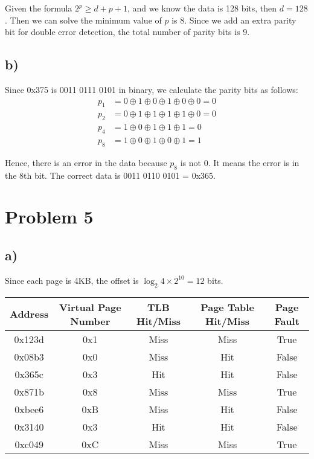 \documentclass[a4paper,12pt]{article}
\begin{document}
Given the formula $2^p \geq d + p + 1$, and we know the data is 128 bits, then $d = 128$.
Then we can solve the minimum value of $p$ is 8.
Since we add an extra parity bit for double error detection, the total number of parity bits is 9.

\subsection*{b)}

Since 0x375 is 0011 0111 0101 in binary, we calculate the parity bits as follows:
\begin{align*}
	p_1 &= 0 \oplus 1 \oplus 0 \oplus 1 \oplus 0 \oplus 0 = 0 \\
	p_2 &= 0 \oplus 1 \oplus 1 \oplus 1 \oplus 1 \oplus 0 = 0 \\
	p_4 &= 1 \oplus 0 \oplus 1 \oplus 1 \oplus 1 = 0 \\
	p_8 &= 1 \oplus 0 \oplus 1 \oplus 0 \oplus 1 = 1
\end{align*}

Hence, there is an error in the data because $p_8$ is not 0.
It means the error is in the 8th bit.
The correct data is 0011 0110 0101 = 0x365.

\section*{Problem 5}

\subsection*{a)}

Since each page is 4KB, the offset is $\log_2 4 \times 2^{10} = 12$ bits.

\begin{table}[H]
	\centering
	\begin{tabular}{ccccc}
		\toprule
		Address & Virtual Page Number & TLB Hit/Miss & Page Table Hit/Miss & Page Fault \\
		\midrule
		0x123d & 0x1 & Miss & Miss & True \\
		0x08b3 & 0x0 & Miss & Hit & False \\
		0x365c & 0x3 & Hit  & Hit & False \\
		0x871b & 0x8 & Miss & Miss & True \\
		0xbee6 & 0xB & Miss & Hit & False \\
		0x3140 & 0x3 & Hit  & Hit & False \\
		0xc049 & 0xC & Miss & Miss & True \\
		\bottomrule
	\end{tabular}
\end{table}
\end{document}
